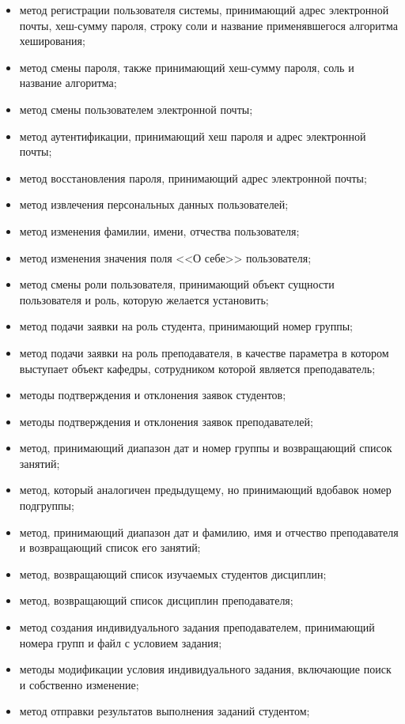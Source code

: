 \begin{itemize}
	\item метод регистрации пользователя системы, принимающий адрес электронной почты, хеш-сумму пароля, строку соли и название применявшегося алгоритма хеширования;
	\item метод смены пароля, также принимающий хеш-сумму пароля, соль и название алгоритма;
	\item метод смены пользователем электронной почты;
	\item метод аутентификации, принимающий хеш пароля и адрес электронной почты;
	\item метод восстановления пароля, принимающий адрес электронной почты;
	\item метод извлечения персональных данных пользователей;
	\item метод изменения фамилии, имени, отчества пользователя;
	\item метод изменения значения поля <<О себе>> пользователя;
	\item метод смены роли пользователя, принимающий объект сущности пользователя и роль, которую желается установить;
	\item метод подачи заявки на роль студента, принимающий номер группы;
	\item метод подачи заявки на роль преподавателя, в качестве параметра в котором выступает объект кафедры, сотрудником которой является преподаватель;
	\item методы подтверждения и отклонения заявок студентов;
	\item методы подтверждения и отклонения заявок преподавателей;
	\item метод, принимающий диапазон дат и номер группы и возвращающий список занятий;
	\item метод, который аналогичен предыдущему, но принимающий вдобавок номер подгруппы;
	\item метод, принимающий диапазон дат и фамилию, имя и отчество преподавателя и возвращающий список его занятий;
	\item метод, возвращающий список изучаемых студентов дисциплин;
	\item метод, возвращающий список дисциплин преподавателя;
	\item метод создания индивидуального задания преподавателем, принимающий номера групп и файл с условием задания;
	\item методы модификации условия индивидуального задания, включающие поиск и собственно изменение;
	\item метод отправки результатов выполнения заданий студентом;

\end{itemize}
